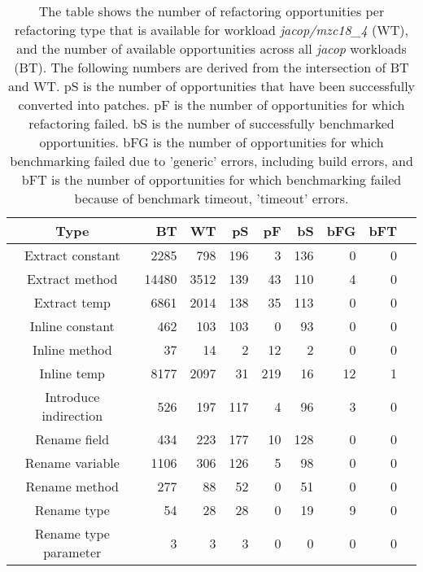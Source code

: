 \begin{table}[!h]
\caption{The table shows the number of refactoring opportunities per refactoring type that is available for workload \textit{jacop/mzc18\_4} (WT), and the number of available opportunities across all \textit{jacop} workloads (BT). The following numbers are derived from the intersection of BT and WT. pS is the number of opportunities that have been successfully converted into patches. pF is the number of opportunities for which refactoring failed. bS is the number of successfully benchmarked opportunities. bFG is the number of opportunities for which benchmarking failed due to 'generic' errors, including build errors, and bFT is the number of opportunities for which benchmarking failed because of benchmark timeout, 'timeout' errors.}
\begin{tabular}{c|*{7}{r}r}
Type&BT&WT&pS&pF&bS&bFG&bFT\\
\hline
Extract constant&2285&798&196&3&136&0&0\\
Extract method&14480&3512&139&43&110&4&0\\
Extract temp&6861&2014&138&35&113&0&0\\
Inline constant&462&103&103&0&93&0&0\\
Inline method&37&14&2&12&2&0&0\\
Inline temp&8177&2097&31&219&16&12&1\\
Introduce indirection&526&197&117&4&96&3&0\\
Rename field&434&223&177&10&128&0&0\\
Rename variable&1106&306&126&5&98&0&0\\
Rename method&277&88&52&0&51&0&0\\
Rename type&54&28&28&0&19&9&0\\
Rename type parameter&3&3&3&0&0&0&0\\
\end{tabular}
\end{table}
